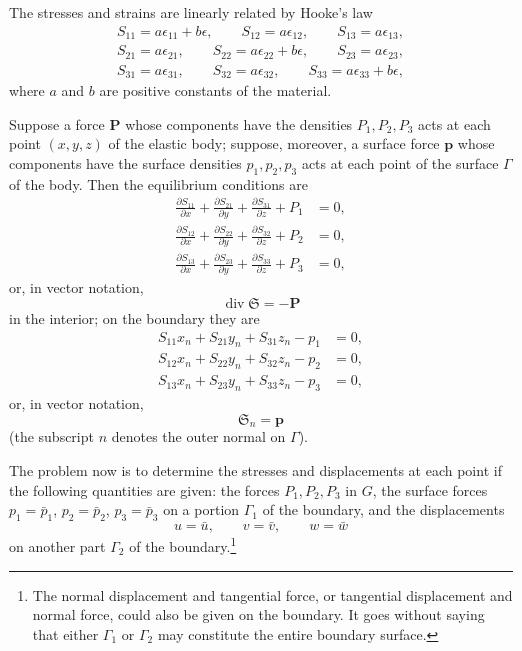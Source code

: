 The stresses and strains are linearly related by Hooke's law
\begin{equation}\tag{115}
\begin{gathered}
S_{11}=a\epsilon_{11}+b\epsilon,\qquad S_{12}=a\epsilon_{12},\qquad S_{13}=a\epsilon_{13},\\
S_{21}=a\epsilon_{21},\qquad S_{22}=a\epsilon_{22}+b\epsilon,\qquad S_{23}=a\epsilon_{23},\\
S_{31}=a\epsilon_{31},\qquad S_{32}=a\epsilon_{32},\qquad S_{33}=a\epsilon_{33}+b\epsilon,
\end{gathered}
\end{equation}
where $a$ and $b$ are positive constants of the material.

Suppose a force $\mathbf P$ whose components have the densities $P_1,P_2,P_3$ acts at each point $(x,y,z)$ of the elastic body; suppose, moreover, a surface force $\mathbf p$ whose components have the surface densities $p_1,p_2,p_3$ acts at each point of the surface $\Gamma$ of the body. Then the equilibrium conditions are
\begin{equation}\tag{116}
\begin{aligned}
\frac{\partial S_{11}}{\partial x}+\frac{\partial S_{21}}{\partial y}+\frac{\partial S_{31}}{\partial z}+P_1&=0,\\
\frac{\partial S_{12}}{\partial x}+\frac{\partial S_{22}}{\partial y}+\frac{\partial S_{32}}{\partial z}+P_2&=0,\\
\frac{\partial S_{13}}{\partial x}+\frac{\partial S_{23}}{\partial y}+\frac{\partial S_{33}}{\partial z}+P_3&=0,
\end{aligned}
\end{equation}
or, in vector notation,
\[
\operatorname{div}\mathfrak S=-\mathbf P
\]
in the interior; on the boundary they are
\begin{equation}\tag{117}
\begin{aligned}
S_{11}x_n+S_{21}y_n+S_{31}z_n-p_1&=0,\\
S_{12}x_n+S_{22}y_n+S_{32}z_n-p_2&=0,\\
S_{13}x_n+S_{23}y_n+S_{33}z_n-p_3&=0,
\end{aligned}
\end{equation}
or, in vector notation,
\[
\mathfrak S_n=\mathbf p
\]
(the subscript $n$ denotes the outer normal on $\Gamma$).

The problem now is to determine the stresses and displacements at each point if the following quantities are given: the forces $P_1,P_2,P_3$ in $G$, the surface forces $p_1=\bar p_1$, $p_2=\bar p_2$, $p_3=\bar p_3$ on a portion $\Gamma_1$ of the boundary, and the displacements
\begin{equation}\tag{118}
u=\bar u,\qquad v=\bar v,\qquad w=\bar w
\end{equation}
on another part $\Gamma_2$ of the boundary.\footnote{The normal displacement and tangential force, or tangential displacement and normal force, could also be given on the boundary. It goes without saying that either $\Gamma_1$ or $\Gamma_2$ may constitute the entire boundary surface.}

